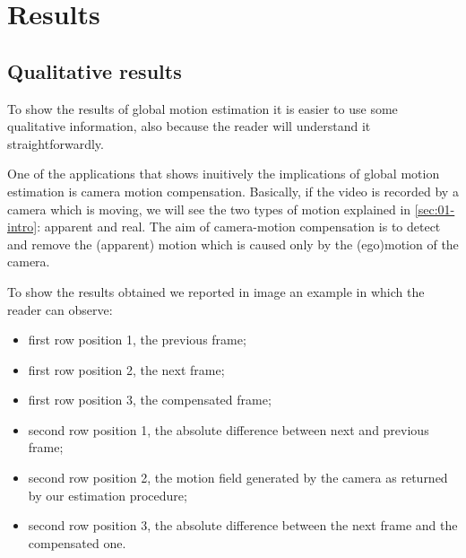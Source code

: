 \section{Results}
\label{sec:04-results}

\subsection{Qualitative results}

To show the results of global motion estimation it is easier to use some qualitative information, also because the reader will understand it straightforwardly.

One of the applications that shows inuitively the implications of global motion estimation is camera motion compensation. 
Basically, if the video is recorded by a camera which is moving, we will see the two types of motion explained in \cref{sec:01-intro}: apparent and real. The aim of camera-motion compensation is to detect and remove the (apparent) motion which is caused only by the (ego)motion of the camera.

To show the results obtained we reported in image  an example in which the reader can observe:
\begin{itemize}
    \item first row position 1, the previous frame;
    \item first row position 2, the next frame;
    \item first row position 3, the compensated frame;
    \item second row position 1, the absolute difference between next and previous frame;
    \item second row position 2, the motion field generated by the camera as returned by our estimation procedure;
    \item second row position 3, the absolute difference between the next frame and the compensated one.
\end{itemize}

